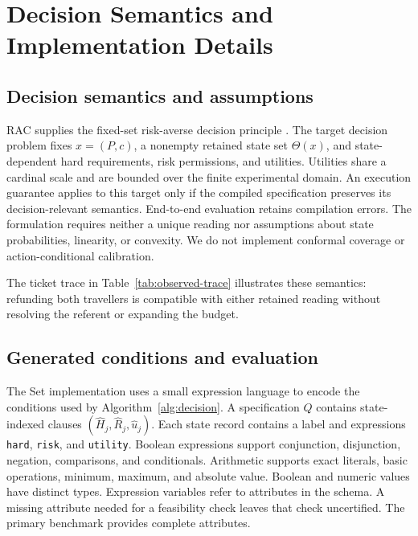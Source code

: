 \section{Decision Semantics and Implementation Details}
\label{app:proofs}
\subsection{Decision semantics and assumptions}
RAC supplies the fixed-set risk-averse decision principle \citep{rac}. The target decision problem fixes $x=(P,c)$, a nonempty retained state set $\Theta(x)$, and state-dependent hard requirements, risk permissions, and utilities. Utilities share a cardinal scale and are bounded over the finite experimental domain. An execution guarantee applies to this target only if the compiled specification preserves its decision-relevant semantics. End-to-end evaluation retains compilation errors. The formulation requires neither a unique reading nor assumptions about state probabilities, linearity, or convexity. We do not implement conformal coverage or action-conditional calibration.

\label{app:ambiguity}
The ticket trace in Table~\ref{tab:observed-trace} illustrates these semantics: refunding both travellers is compatible with either retained reading without resolving the referent or expanding the budget.

\subsection{Generated conditions and evaluation}
\label{app:interface}
The Set implementation uses a small expression language to encode the conditions used by Algorithm~\ref{alg:decision}. A specification $Q$ contains state-indexed clauses $(\widehat H_j,\widehat R_j,\widehat u_j)$. Each state record contains a label and expressions \texttt{hard}, \texttt{risk}, and \texttt{utility}. Boolean expressions support conjunction, disjunction, negation, comparisons, and conditionals. Arithmetic supports exact literals, basic operations, minimum, maximum, and absolute value. Boolean and numeric values have distinct types. Expression variables refer to attributes in the schema. A missing attribute needed for a feasibility check leaves that check uncertified. The primary benchmark provides complete attributes.

